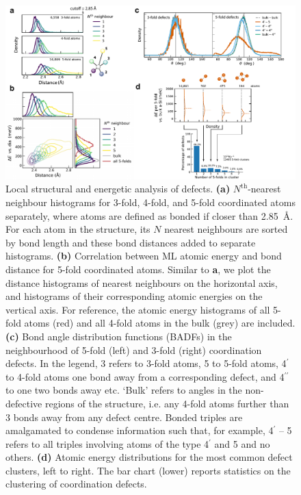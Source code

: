 \documentclass[12pt,a4paper,twoside,nobind]{ociamthesis}
\begin{document}
\begin{figure}[ht]
  \centering
  \includegraphics[width=\linewidth]{rejig_fig2_tos_2x2.pdf}
  \caption{
    Local structural and energetic analysis of defects. 
    \textbf{(a)} $N^{\mathrm{th}}$-nearest neighbour histograms for 3-fold, 4-fold, and 5-fold coordinated atoms separately, where atoms are defined as bonded if closer than \SI{2.85}{\AA}.
    For each atom in the structure, its $N$ nearest neighbours are sorted by bond length and these bond distances added to separate histograms.
    \textbf{(b)} Correlation between ML atomic energy and bond distance for 5-fold coordinated atoms. Similar to \textbf{a}, 
    we plot the distance histograms of nearest neighbours on the horizontal axis, and histograms of their corresponding atomic energies on the vertical axis. For reference, the atomic energy histograms
    of all 5-fold atoms (red) and all 4-fold atoms in the bulk (grey) are included.
    \textbf{(c)} Bond angle distribution functions (BADFs) in the neighbourhood of 5-fold (left) and 3-fold (right) coordination defects.
    In the legend, 3 refers to 3-fold atoms, 5 to 5-fold atoms, 4$^\prime$ to 4-fold atoms one bond away from a corresponding defect, and 4$^{\prime\prime}$ to one two bonds away etc. 
    `Bulk' refers to angles in the non-defective regions of the structure, i.e. any 4-fold atoms further than 3 bonds away from any defect centre.
    Bonded triples are amalgamated to condense information such that, for example, 4$^\prime$ – 5 refers to all triples involving atoms of the type 4$^\prime$ and 5 and no others.
    \textbf{(d)} Atomic energy distributions for the most common defect clusters, left to right.
    The bar chart (lower) reports statistics on the clustering of coordination defects. 
    }
  \label{fig:defects2}
\end{figure}
\end{document}
